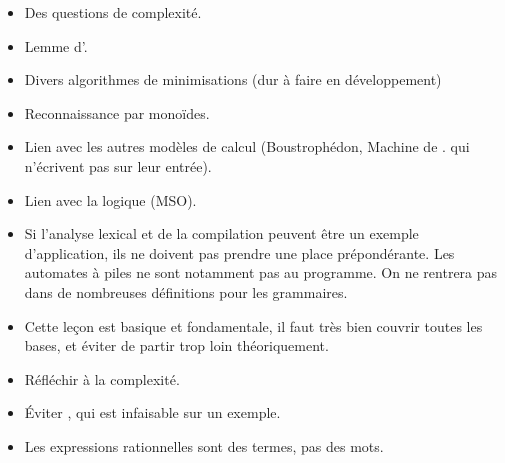 \documentclass{agregfiche}
\begin{document}
\secidees
\begin{itemize}
	\item Des questions de complexité.
    \item Lemme d'.
	\item Divers algorithmes de minimisations (dur à faire en développement)
	\item Reconnaissance par monoïdes.
	\item Lien avec les autres modèles de calcul (Boustrophédon, Machine de .
	qui n'écrivent pas sur leur entrée).
	\item Lien avec la logique (MSO).
\end{itemize}


\secpieges

\begin{itemize}
\item Si l'analyse lexical et de la compilation peuvent être un exemple d'application, ils ne doivent pas prendre une place prépondérante. Les automates à piles ne sont notamment pas au programme. On ne rentrera pas dans de nombreuses définitions pour les grammaires.
\item Cette leçon est basique et fondamentale, il faut très bien couvrir toutes les bases, et éviter de partir trop loin théoriquement.
\item Réfléchir à la complexité.
\item Éviter  , qui est infaisable sur un exemple.
\item Les expressions rationnelles sont des termes, pas des mots.
\end{itemize}
\end{document}
